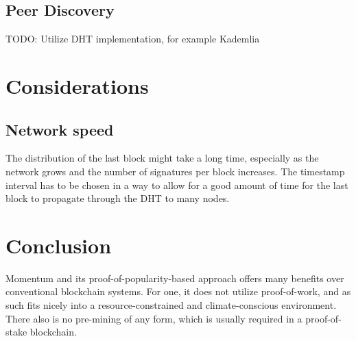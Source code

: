 \documentclass[conference]{IEEEtran}
\begin{document}
\subsection{Peer Discovery}
TODO: Utilize DHT implementation, for example Kademlia

\section{Considerations}

\subsection{Network speed}
The distribution of the last block might take a long time, especially as the network
grows and the number of signatures per block increases. The timestamp interval has to be chosen in a way
to allow for a good amount of time for the last block to propagate through the DHT to many nodes.

\section{Conclusion}
Momentum and its proof-of-popularity-based approach offers many benefits over conventional blockchain systems.
For one, it does not utilize proof-of-work,
and as such fits nicely into a resource-constrained and climate-conscious environment. There also is no pre-mining of
any form, which is usually required in a proof-of-stake blockchain.
\end{document}
